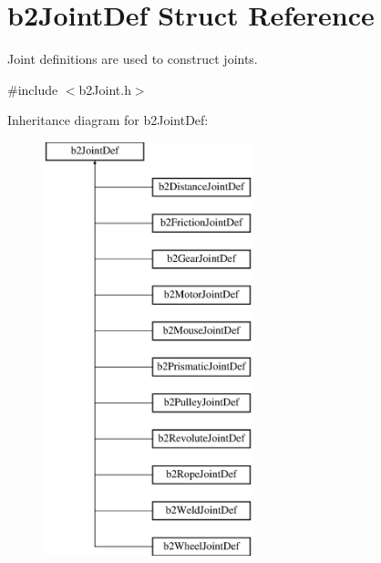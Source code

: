 \hypertarget{structb2JointDef}{}\section{b2\+Joint\+Def Struct Reference}
\label{structb2JointDef}


Joint definitions are used to construct joints.  




{\ttfamily \#include $<$b2\+Joint.\+h$>$}

Inheritance diagram for b2\+Joint\+Def\+:\begin{figure}[H]
\begin{center}
\leavevmode
\includegraphics[height=12.000000cm]{structb2JointDef}
\end{center}
\end{figure}
